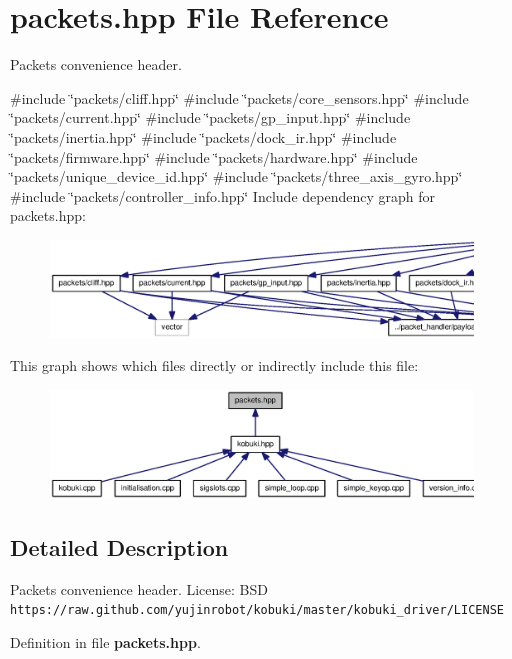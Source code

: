 \section{packets.\-hpp \-File \-Reference}
\label{packets_8hpp}


\-Packets convenience header.  


{\ttfamily \#include \char`\"{}packets/cliff.\-hpp\char`\"{}}\*
{\ttfamily \#include \char`\"{}packets/core\-\_\-sensors.\-hpp\char`\"{}}\*
{\ttfamily \#include \char`\"{}packets/current.\-hpp\char`\"{}}\*
{\ttfamily \#include \char`\"{}packets/gp\-\_\-input.\-hpp\char`\"{}}\*
{\ttfamily \#include \char`\"{}packets/inertia.\-hpp\char`\"{}}\*
{\ttfamily \#include \char`\"{}packets/dock\-\_\-ir.\-hpp\char`\"{}}\*
{\ttfamily \#include \char`\"{}packets/firmware.\-hpp\char`\"{}}\*
{\ttfamily \#include \char`\"{}packets/hardware.\-hpp\char`\"{}}\*
{\ttfamily \#include \char`\"{}packets/unique\-\_\-device\-\_\-id.\-hpp\char`\"{}}\*
{\ttfamily \#include \char`\"{}packets/three\-\_\-axis\-\_\-gyro.\-hpp\char`\"{}}\*
{\ttfamily \#include \char`\"{}packets/controller\-\_\-info.\-hpp\char`\"{}}\*
\-Include dependency graph for packets.\-hpp\-:
\nopagebreak
\begin{figure}[H]
\begin{center}
\leavevmode
\includegraphics[width=350pt]{packets_8hpp__incl}
\end{center}
\end{figure}
\-This graph shows which files directly or indirectly include this file\-:
\nopagebreak
\begin{figure}[H]
\begin{center}
\leavevmode
\includegraphics[width=350pt]{packets_8hpp__dep__incl}
\end{center}
\end{figure}


\subsection{\-Detailed \-Description}
\-Packets convenience header. \-License\-: \-B\-S\-D {\tt https\-://raw.\-github.\-com/yujinrobot/kobuki/master/kobuki\-\_\-driver/\-L\-I\-C\-E\-N\-S\-E} 

\-Definition in file {\bf packets.\-hpp}.

